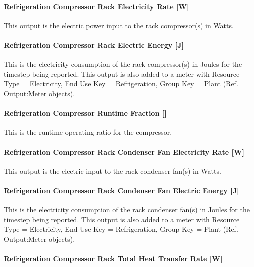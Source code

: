 \paragraph{Refrigeration Compressor Rack Electricity Rate {[}W{]}}\label{refrigeration-compressor-rack-electric-power-w}

This output is the electric power input to the rack compressor(s) in Watts.

\paragraph{Refrigeration Compressor Rack Electric Energy {[}J{]}}\label{refrigeration-compressor-rack-electric-energy-j}

This is the electricity consumption of the rack compressor(s) in Joules for the timestep being reported. This output is also added to a meter with Resource Type = Electricity, End Use Key = Refrigeration, Group Key = Plant (Ref. Output:Meter objects).

\paragraph{Refrigeration Compressor Runtime Fraction {[]}}\label{refrigeration-compressor-runtime-fraction}

This is the runtime operating ratio for the compressor.

\paragraph{Refrigeration Compressor Rack Condenser Fan Electricity Rate {[}W{]}}\label{refrigeration-compressor-rack-condenser-fan-electric-power-w}

This output is the electric input to the rack condenser fan(s) in Watts.

\paragraph{Refrigeration Compressor Rack Condenser Fan Electric Energy {[}J{]}}\label{refrigeration-compressor-rack-condenser-fan-electric-energy-j}

This is the electricity consumption of the rack condenser fan(s) in Joules for the timestep being reported. This output is also added to a meter with Resource Type = Electricity, End Use Key = Refrigeration, Group Key = Plant (Ref. Output:Meter objects).

\paragraph{Refrigeration Compressor Rack Total Heat Transfer Rate {[}W{]}}\label{refrigeration-compressor-rack-total-heat-transfer-rate-w}

